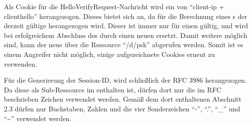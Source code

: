 Als Cookie für die HelloVerifyRequest-Nachricht wird ein  von "`client-ip + clienthello"' herangezogen. Dieses bietet sich an, da für die Berechnung eines
s der derzeit gültige  herangezogen wird. Dieser ist immer nur für einen  gültig, und wird bei erfolgreichem Abschluss des
 durch einen neuen  ersetzt. Damit weitere  möglich sind, kann der neue  über die Ressource "`/d/psk"'
abgerufen werden. Somit ist es einem Angreifer nicht möglich, einige aufgezeichnete Cookies erneut zu verwenden.

Für die Generierung der Session-ID, wird schließlich der RFC 3986 \cite{rfc3986} herangezogen. Da diese als Sub-Ressource im  enthalten ist,
dürfen dort nur die im RFC beschrieben Zeichen verwendet werden. Gemäß dem dort enthaltenen Abschnitt 2.3 dürfen nur Buchstaben, Zahlen und die vier
Sonderzeichen "`-"', "`."', "`\_"' und "`\textasciitilde"' verwendet werden.